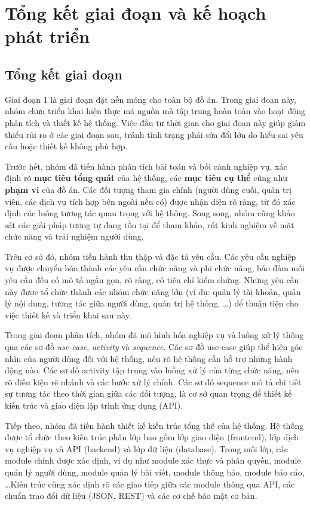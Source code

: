 \chapter{Tổng kết giai đoạn và kế hoạch phát triển}

\section{Tổng kết giai đoạn}

Giai đoạn 1 là giai đoạn đặt nền móng cho toàn bộ đồ án. Trong giai đoạn này, nhóm chưa triển khai hiện thực mã nguồn mà tập trung hoàn toàn vào hoạt động phân tích và thiết kế hệ thống. Việc đầu tư thời gian cho giai đoạn này giúp giảm thiểu rủi ro ở các giai đoạn sau, tránh tình trạng phải sửa đổi lớn do hiểu sai yêu cầu hoặc thiết kế không phù hợp.

Trước hết, nhóm đã tiến hành phân tích bài toán và bối cảnh nghiệp vụ, xác định rõ \textbf{mục tiêu tổng quát} của hệ thống, các \textbf{mục tiêu cụ thể} cũng như \textbf{phạm vi} của đồ án. Các đối tượng tham gia chính (người dùng cuối, quản trị viên, các dịch vụ tích hợp bên ngoài nếu có) được nhận diện rõ ràng, từ đó xác định các luồng tương tác quan trọng với hệ thống. Song song, nhóm cũng khảo sát các giải pháp tương tự đang tồn tại để tham khảo, rút kinh nghiệm về mặt chức năng và trải nghiệm người dùng.

Trên cơ sở đó, nhóm tiến hành thu thập và đặc tả yêu cầu. Các yêu cầu nghiệp vụ được chuyển hóa thành các yêu cầu chức năng và phi chức năng, bảo đảm mỗi yêu cầu đều có mô tả ngắn gọn, rõ ràng, có tiêu chí kiểm chứng. Những yêu cầu này được tổ chức thành các nhóm chức năng lớn (ví dụ: quản lý tài khoản, quản lý nội dung, tương tác giữa người dùng, quản trị hệ thống, \ldots) để thuận tiện cho việc thiết kế và triển khai sau này.

Trong giai đoạn phân tích, nhóm đã mô hình hóa nghiệp vụ và luồng xử lý thông qua các sơ đồ \textit{use-case}, \textit{activity} và \textit{sequence}. Các sơ đồ use-case giúp thể hiện góc nhìn của người dùng đối với hệ thống, nêu rõ hệ thống cần hỗ trợ những hành động nào. Các sơ đồ activity tập trung vào luồng xử lý của từng chức năng, nêu rõ điều kiện rẽ nhánh và các bước xử lý chính. Các sơ đồ sequence mô tả chi tiết sự tương tác theo thời gian giữa các đối tượng, là cơ sở quan trọng để thiết kế kiến trúc và giao diện lập trình ứng dụng (API).

Tiếp theo, nhóm đã tiến hành thiết kế kiến trúc tổng thể của hệ thống. Hệ thống được tổ chức theo kiến trúc phân lớp bao gồm lớp giao diện (frontend), lớp dịch vụ nghiệp vụ và API (backend) và lớp dữ liệu (database). Trong mỗi lớp, các module chính được xác định, ví dụ như module xác thực và phân quyền, module quản lý người dùng, module quản lý bài viết, module thông báo, module báo cáo, \ldots Kiến trúc cũng xác định rõ các giao tiếp giữa các module thông qua API, các chuẩn trao đổi dữ liệu (JSON, REST) và các cơ chế bảo mật cơ bản.

